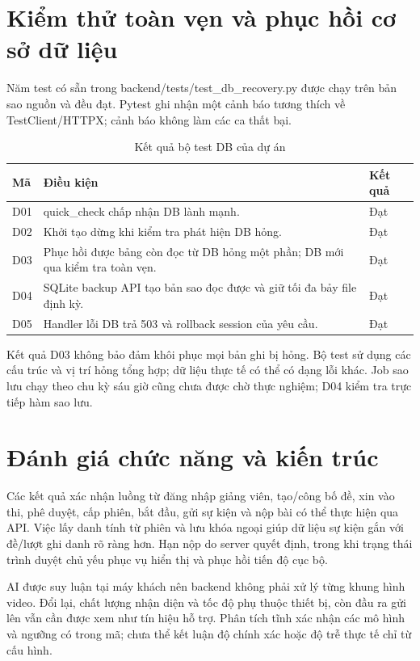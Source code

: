\section{Kiểm thử toàn vẹn và phục hồi cơ sở dữ liệu}
Năm test có sẵn trong backend/tests/test\_db\_recovery.py được chạy trên bản sao nguồn và đều đạt. Pytest ghi nhận một cảnh báo tương thích về TestClient/HTTPX; cảnh báo không làm các ca thất bại.
\begin{longtable}{@{}L{1.2cm}L{11.4cm}L{1.8cm}@{}}
\caption{Kết quả bộ test DB của dự án}\\
\toprule Mã & Điều kiện & Kết quả \\\midrule\endhead
D01 & quick\_check chấp nhận DB lành mạnh. & Đạt\\
D02 & Khởi tạo dừng khi kiểm tra phát hiện DB hỏng. & Đạt\\
D03 & Phục hồi được bảng còn đọc từ DB hỏng một phần; DB mới qua kiểm tra toàn vẹn. & Đạt\\
D04 & SQLite backup API tạo bản sao đọc được và giữ tối đa bảy file định kỳ. & Đạt\\
D05 & Handler lỗi DB trả 503 và rollback session của yêu cầu. & Đạt\\
\bottomrule
\end{longtable}

Kết quả D03 không bảo đảm khôi phục mọi bản ghi bị hỏng. Bộ test sử dụng các cấu trúc và vị trí hỏng tổng hợp; dữ liệu thực tế có thể có dạng lỗi khác. Job sao lưu chạy theo chu kỳ sáu giờ cũng chưa được chờ thực nghiệm; D04 kiểm tra trực tiếp hàm sao lưu.

\section{Đánh giá chức năng và kiến trúc}
Các kết quả xác nhận luồng từ đăng nhập giảng viên, tạo/công bố đề, xin vào thi, phê duyệt, cấp phiên, bắt đầu, gửi sự kiện và nộp bài có thể thực hiện qua API. Việc lấy danh tính từ phiên và lưu khóa ngoại giúp dữ liệu sự kiện gắn với đề/lượt ghi danh rõ ràng hơn. Hạn nộp do server quyết định, trong khi trạng thái trình duyệt chủ yếu phục vụ hiển thị và phục hồi tiến độ cục bộ.

AI được suy luận tại máy khách nên backend không phải xử lý từng khung hình video. Đổi lại, chất lượng nhận diện và tốc độ phụ thuộc thiết bị, còn đầu ra gửi lên vẫn cần được xem như tín hiệu hỗ trợ. Phân tích tĩnh xác nhận các mô hình và ngưỡng có trong mã; chưa thể kết luận độ chính xác hoặc độ trễ thực tế chỉ từ cấu hình.

